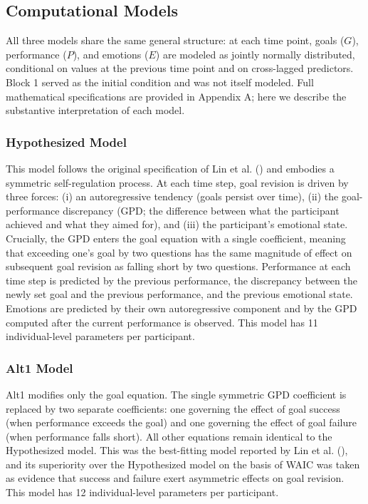 \documentclass[
  man,
  floatsintext,
  longtable,
  nolmodern,
  notxfonts,
  notimes,
  colorlinks=true,linkcolor=blue,citecolor=blue,urlcolor=blue]{apa7}
\begin{document}
\subsection{Computational Models}\label{computational-models}

All three models share the same general structure: at each time point,
goals (\(G\)), performance (\(P\)), and emotions (\(E\)) are modeled as
jointly normally distributed, conditional on values at the previous time
point and on cross-lagged predictors. Block 1 served as the initial
condition and was not itself modeled. Full mathematical specifications
are provided in Appendix A; here we describe the substantive
interpretation of each model.

\subsubsection{Hypothesized Model}\label{hypothesized-model}

This model follows the original specification of Lin et al.
() and embodies a symmetric
self-regulation process. At each time step, goal revision is driven by
three forces: (i) an autoregressive tendency (goals persist over time),
(ii) the goal-performance discrepancy (GPD; the difference between what
the participant achieved and what they aimed for), and (iii) the
participant's emotional state. Crucially, the GPD enters the goal
equation with a single coefficient, meaning that exceeding one's goal by
two questions has the same magnitude of effect on subsequent goal
revision as falling short by two questions. Performance at each time
step is predicted by the previous performance, the discrepancy between
the newly set goal and the previous performance, and the previous
emotional state. Emotions are predicted by their own autoregressive
component and by the GPD computed after the current performance is
observed. This model has 11 individual-level parameters per participant.

\subsubsection{Alt1 Model}\label{alt1-model}

Alt1 modifies only the goal equation. The single symmetric GPD
coefficient is replaced by two separate coefficients: one governing the
effect of goal success (when performance exceeds the goal) and one
governing the effect of goal failure (when performance falls short). All
other equations remain identical to the Hypothesized model. This was the
best-fitting model reported by Lin et al.
(), and its superiority over the
Hypothesized model on the basis of WAIC was taken as evidence that
success and failure exert asymmetric effects on goal revision. This
model has 12 individual-level parameters per participant.
\end{document}
